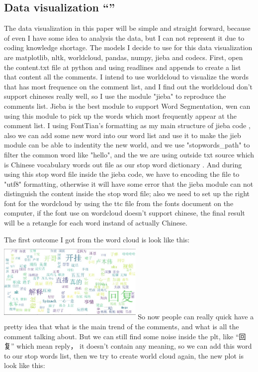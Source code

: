 \documentclass[sigconf]{acmart}
\begin{document}
\subsection{Data visualization ``'' }
The data visualization in this paper will be simple and straight forward, because of even I have some idea to analysis the data, but I can not represent it due to coding knowledge shortage. The models I decide to use for this data visualization are matplotlib, nltk, worldcloud, pandas, numpy, jieba and codecs. First, open the content.txt file at python and using readlines and appends to create a list that content all the comments. I intend to use worldcloud to visualize the words that has most frequence on the comment list, and I find out the worldcloud don't support chineses really well, so I use the module "jieba" to reproduce the comments list. Jieba is the best module to support Word Segmentation, wen can using this module to pick up the words which most frequently appear at the comment list\cite{method:08}. I using FontTian's formatting as my main structure of jieba code  \cite{method:08}, also we can add some new word into our word list and use it to make the jieb module can be able to indentity the new world, and we use "stopwords\_path" to filter the common word like "hello", and the we are using outside txt source which is Chinese vocabulary words out file as our stop word dictionary \cite{method:10}. And during using this stop word file inside the jieba code, we have to encoding the file to "utf8" formatting, otherwise it will have some error that the jieba module can not distinguish the content inside the stop word file; also we need to set up the right font for the wordcloud by using the ttc file from the fonts document on the computer, if the font use on wordcloud doesn't support chinese, the final result will be a retangle for each word instand of actually Chinese. 

The first outcome I got from the word cloud is look like this:
\includegraphics[width=7cm, height=4cm]{2.jpg}
So now people can really quick have a pretty idea that what is the main trend of the comments, and what is all the comment talking about. But we can still find some noise inside the plt, like ``回复'' which mean reply， it doesn't contain any meaning, so we can add this word to our stop words list, then we try to create world cloud again, the new plot is look like this:
\end{document}
